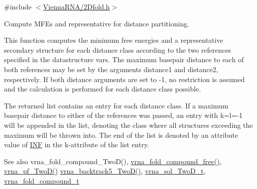{\ttfamily \#include $<$\hyperlink{2Dfold_8h}{Vienna\+R\+N\+A/2\+Dfold.\+h}$>$}



Compute M\+FE\textquotesingle{}s and representative for distance partitioning. 

This function computes the minimum free energies and a representative secondary structure for each distance class according to the two references specified in the datastructure \textquotesingle{}vars\textquotesingle{}. The maximum basepair distance to each of both references may be set by the arguments \textquotesingle{}distance1\textquotesingle{} and \textquotesingle{}distance2\textquotesingle{}, respectively. If both distance arguments are set to \textquotesingle{}-\/1\textquotesingle{}, no restriction is assumed and the calculation is performed for each distance class possible.

The returned list contains an entry for each distance class. If a maximum basepair distance to either of the references was passed, an entry with k=l=-\/1 will be appended in the list, denoting the class where all structures exceeding the maximum will be thrown into. The end of the list is denoted by an attribute value of \hyperlink{energy__const_8h_a12c2040f25d8e3a7b9e1c2024c618cb6}{I\+NF} in the k-\/attribute of the list entry.

\begin{DoxySeeAlso}{See also}
vrna\+\_\+fold\+\_\+compound\+\_\+\+Two\+D(), \hyperlink{group__fold__compound_gadded6039d63f5d6509836e20321534ad}{vrna\+\_\+fold\+\_\+compound\+\_\+free()}, \hyperlink{group__kl__neighborhood__pf_ga0bc3427689bd09da09b8b3094a27f836}{vrna\+\_\+pf\+\_\+\+Two\+D()} \hyperlink{group__kl__neighborhood__mfe_ga15a96fc96f4f4c2e01a11b3e17d1ef43}{vrna\+\_\+backtrack5\+\_\+\+Two\+D()}, \hyperlink{group__kl__neighborhood__mfe_structvrna__sol__TwoD__t}{vrna\+\_\+sol\+\_\+\+Two\+D\+\_\+t}, \hyperlink{group__fold__compound_ga1b0cef17fd40466cef5968eaeeff6166}{vrna\+\_\+fold\+\_\+compound\+\_\+t}
\end{DoxySeeAlso}

